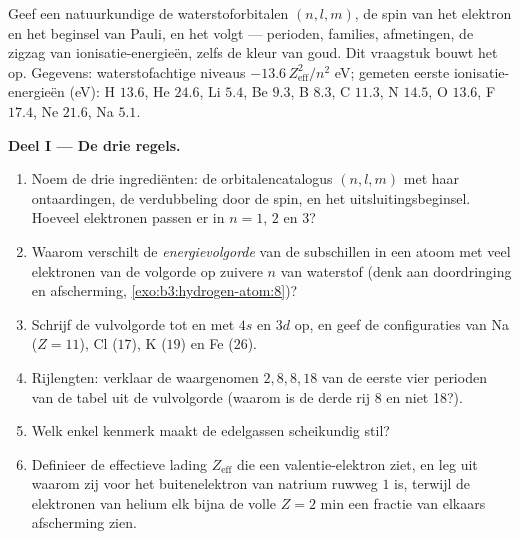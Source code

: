 \begin{problem}\label{pb:b3:identical-particles:1}
Geef een natuurkundige de waterstoforbitalen $(n, l, m)$, de spin van het
elektron en het beginsel van Pauli, en het  volgt ---
perioden, families, afmetingen, de zigzag van ionisatie-energieën, zelfs
de kleur van goud. Dit vraagstuk bouwt het op. Gegevens: waterstofachtige
niveaus $-13.6\,Z_{\text{eff}}^2/n^2$ eV; gemeten eerste
ionisatie-energieën (eV): H $13.6$, He $24.6$, Li $5.4$, Be $9.3$, B
$8.3$, C $11.3$, N $14.5$, O $13.6$, F $17.4$, Ne $21.6$, Na $5.1$.

\medskip\noindent\textbf{Deel I --- De drie regels.}
\begin{enumerate}
  \item Noem de drie ingrediënten: de orbitalencatalogus $(n, l, m)$ met
        haar ontaardingen, de verdubbeling door de spin, en het
        uitsluitingsbeginsel. Hoeveel elektronen passen er in $n = 1$,
        $2$ en $3$?
  \item Waarom verschilt de \emph{energievolgorde} van de subschillen in
        een atoom met veel elektronen van de volgorde op zuivere $n$ van
        waterstof (denk aan doordringing en afscherming,
        \cref{exo:b3:hydrogen-atom:8})?
  \item Schrijf de vulvolgorde tot en met $4s$ en $3d$ op, en geef de
        configuraties van Na ($Z = 11$), Cl ($17$), K ($19$) en Fe
        ($26$).
  \item Rijlengten: verklaar de waargenomen $2, 8, 8, 18$ van de eerste
        vier perioden van de tabel uit de vulvolgorde (waarom is de derde
        rij 8 en niet 18?).
  \item Welk enkel kenmerk maakt de edelgassen scheikundig stil?
  \item Definieer de effectieve lading $Z_{\text{eff}}$ die een
        valentie-elektron ziet, en leg uit waarom zij voor het
        buitenelektron van natrium ruwweg $1$ is, terwijl de elektronen
        van helium elk bijna de volle $Z = 2$ min een fractie van
        elkaars afscherming zien.
\end{enumerate}


\end{problem}

